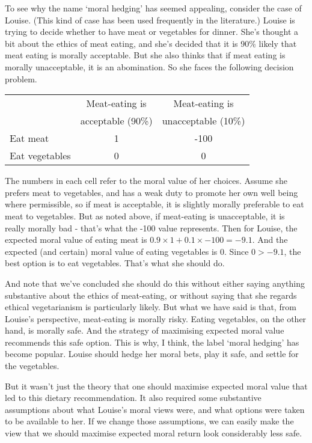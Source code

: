 \documentclass[11pt,]{book}
\def\toprule{}
\def\bottomrule{}
\begin{document}
To see why the name `moral hedging' has seemed appealing, consider the case of Louise. (This kind of case has been used frequently in the literature.) Louise is trying to decide whether to have meat or vegetables for dinner. She's thought a bit about the ethics of meat eating, and she's decided that it is 90\% likely that meat eating is morally acceptable. But she also thinks that if meat eating is morally unacceptable, it is an abomination. So she faces the following decision problem.

\begin{longtable}[]{@{}lcc@{}}
\toprule
\endhead
& Meat-eating is & Meat-eating is\tabularnewline
& acceptable (90\%) & unacceptable (10\%)\tabularnewline
Eat meat & 1 & -100\tabularnewline
Eat vegetables & 0 & 0\tabularnewline
\bottomrule
\end{longtable}

The numbers in each cell refer to the moral value of her choices. Assume she prefers meat to vegetables, and has a weak duty to promote her own well being where permissible, so if meat is acceptable, it is slightly morally preferable to eat meat to vegetables. But as noted above, if meat-eating is unacceptable, it is really morally bad - that's what the -100 value represents. Then for Louise, the expected moral value of eating meat is \(0.9 \times 1 + 0.1 \times -100 = -9.1\). And the expected (and certain) moral value of eating vegetables is 0. Since \(0 > -9.1\), the best option is to eat vegetables. That's what she should do.

And note that we've concluded she should do this without either saying anything substantive about the ethics of meat-eating, or without saying that she regards ethical vegetarianism is particularly likely. But what we have said is that, from Louise's perspective, meat-eating is morally risky. Eating vegetables, on the other hand, is morally safe. And the strategy of maximising expected moral value recommends this safe option. This is why, I think, the label `moral hedging' has become popular. Louise should hedge her moral bets, play it safe, and settle for the vegetables.

But it wasn't just the theory that one should maximise expected moral value that led to this dietary recommendation. It also required some substantive assumptions about what Louise's moral views were, and what options were taken to be available to her. If we change those assumptions, we can easily make the view that we should maximise expected moral return look considerably less safe.
\end{document}
